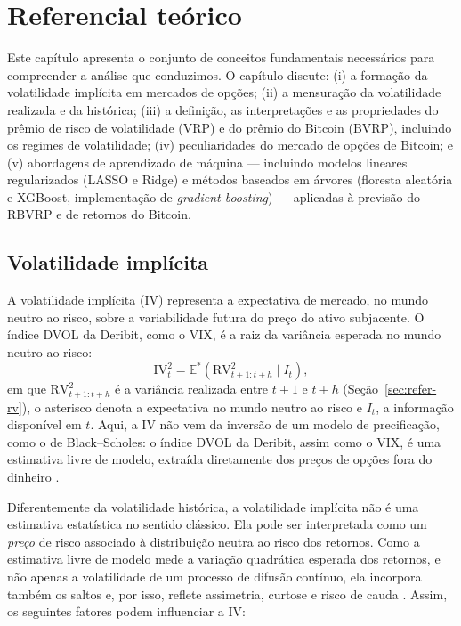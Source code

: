 \chapter{Referencial teórico}
\label{chap:referencial}

Este capítulo apresenta o conjunto de conceitos fundamentais necessários para
compreender a análise que conduzimos. O capítulo discute: (i) a
formação da volatilidade implícita em mercados de opções; (ii) a mensuração da
volatilidade realizada e da histórica; (iii) a definição, as interpretações e as propriedades
do prêmio de risco de volatilidade (VRP) e do prêmio do Bitcoin (BVRP),
incluindo os regimes de volatilidade; (iv) peculiaridades do mercado de opções
de Bitcoin; e (v) abordagens de aprendizado de máquina --- incluindo modelos
lineares regularizados (LASSO e Ridge) e métodos baseados em árvores (floresta
aleatória e XGBoost, implementação de \textit{gradient boosting}) --- aplicadas à previsão do RBVRP e de
retornos do Bitcoin.

\section{Volatilidade implícita}

A volatilidade implícita (IV) representa a
expectativa de mercado, no mundo neutro ao risco, sobre a variabilidade futura
do preço do ativo subjacente. O índice DVOL da Deribit, como o VIX, é a raiz da
variância esperada no mundo neutro ao risco:
\begin{equation}
\text{IV}_t^2 = \mathbb{E}^*(\text{RV}^2_{t+1:t+h} \mid I_t),
\label{eq:refer-iv2}
\end{equation}
em que $\text{RV}^2_{t+1:t+h}$ é a variância realizada entre $t+1$ e $t+h$
(Seção~\ref{sec:refer-rv}), o asterisco denota a expectativa no mundo neutro ao
risco e $I_t$, a informação disponível em $t$. Aqui,
a IV não vem da inversão de um modelo de precificação, como o de Black--Scholes:
o índice DVOL da Deribit, assim como o VIX, é uma estimativa livre de modelo,
extraída diretamente dos preços de opções fora do dinheiro
\citep{carr2009variance, cboe2019vix}.

Diferentemente da volatilidade histórica, a volatilidade implícita não é uma
estimativa estatística no sentido clássico. Ela pode ser interpretada como um
\textit{preço} de risco associado à distribuição neutra ao risco dos retornos.
Como a estimativa livre de modelo mede a variação quadrática esperada dos
retornos, e não apenas a volatilidade de um processo de difusão contínuo, ela
incorpora também os saltos e, por isso, reflete assimetria, curtose e risco de
cauda \citep{carr2009variance}. Assim, os seguintes fatores podem influenciar a IV:

